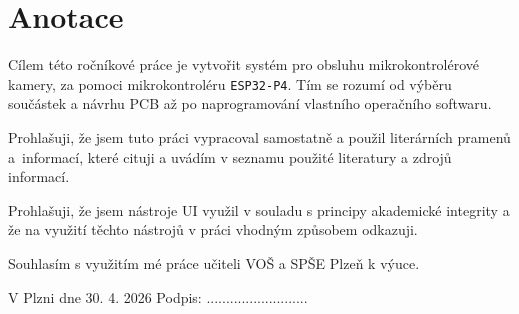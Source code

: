 \documentclass[12pt, a4paper, oneside]{report}
\begin{document}
\newpage
\chapter*{Anotace} \indent
\thispagestyle{empty}

Cílem této ročníkové práce je vytvořit systém pro obsluhu mikrokontrolérové kamery, za pomoci mikrokontroléru \texttt{ESP32-P4}. Tím se rozumí od výběru součástek a návrhu PCB až po naprogramování vlastního operačního softwaru. 
\vfill

Prohlašuji, že jsem tuto práci vypracoval samostatně a použil literárních pramenů a~\mbox{informací}, které cituji a uvádím v seznamu použité literatury a zdrojů informací.

Prohlašuji, že jsem nástroje UI využil v souladu s principy akademické integrity a že na využití těchto nástrojů v práci vhodným způsobem odkazuji.

Souhlasím s využitím mé práce učiteli VOŠ a SPŠE Plzeň k výuce.

\vspace{1cm}

V Plzni dne 30. 4. 2026 \hfill Podpis: ..........................

\newpage
\tableofcontents
\thispagestyle{empty}

\newpage
\end{document}
